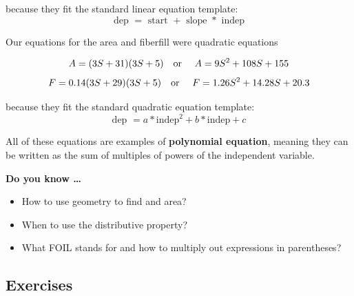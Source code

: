 because they fit the standard linear equation template:  
$$ \text{dep } = \text{ start } + \text{ slope } * \text{ indep}$$

Our equations for the area and fiberfill were quadratic equations

$$A=(3S+31)(3S+5)\text{\quad or \quad}
A = 9S^2+108S + 155$$
$$F = 0.14 (3S + 29)(3S + 5) \text{\quad or \quad} F= 1.26S^2 + 14.28S + 20.3$$

because they fit the standard quadratic equation template: 
    $$\text{dep } = a*\text{indep}^2+b*\text{indep}+c$$

All of these equations are examples of  \textbf{polynomial equation}, meaning they can be written as the sum of multiples of powers of the independent variable.



\noindent \textbf{Do you know \ldots}

\begin{itemize}
\item How to use geometry to find and area?
\item When to use the distributive property?
\item What FOIL stands for and how to multiply out expressions in parentheses?
  
\end{itemize}

\subsection*{Exercises}

